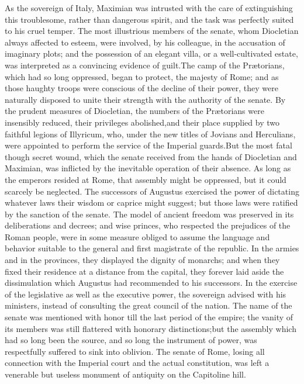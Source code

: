 As the sovereign of Italy, Maximian was intrusted with the care
of extinguishing this troublesome, rather than dangerous spirit,
and the task was perfectly suited to his cruel temper. The most
illustrious members of the senate, whom Diocletian always
affected to esteem, were involved, by his colleague, in the
accusation of imaginary plots; and the possession of an elegant
villa, or a well-cultivated estate, was interpreted as a
convincing evidence of guilt.\footnotemark[93] The camp of the Prætorians,
which had so long oppressed, began to protect, the majesty of
Rome; and as those haughty troops were conscious of the decline
of their power, they were naturally disposed to unite their
strength with the authority of the senate. By the prudent
measures of Diocletian, the numbers of the Prætorians were
insensibly reduced, their privileges abolished,\footnotemark[94] and their
place supplied by two faithful legions of Illyricum, who, under
the new titles of Jovians and Herculians, were appointed to
perform the service of the Imperial guards.\footnotemark[95] But the most fatal
though secret wound, which the senate received from the hands of
Diocletian and Maximian, was inflicted by the inevitable
operation of their absence. As long as the emperors resided at
Rome, that assembly might be oppressed, but it could scarcely be
neglected. The successors of Augustus exercised the power of
dictating whatever laws their wisdom or caprice might suggest;
but those laws were ratified by the sanction of the senate. The
model of ancient freedom was preserved in its deliberations and
decrees; and wise princes, who respected the prejudices of the
Roman people, were in some measure obliged to assume the language
and behavior suitable to the general and first magistrate of the
republic. In the armies and in the provinces, they displayed the
dignity of monarchs; and when they fixed their residence at a
distance from the capital, they forever laid aside the
dissimulation which Augustus had recommended to his successors.
In the exercise of the legislative as well as the executive
power, the sovereign advised with his ministers, instead of
consulting the great council of the nation. The name of the
senate was mentioned with honor till the last period of the
empire; the vanity of its members was still flattered with
honorary distinctions;\footnotemark[96] but the assembly which had so long been
the source, and so long the instrument of power, was respectfully
suffered to sink into oblivion. The senate of Rome, losing all
connection with the Imperial court and the actual constitution,
was left a venerable but useless monument of antiquity on the
Capitoline hill.

